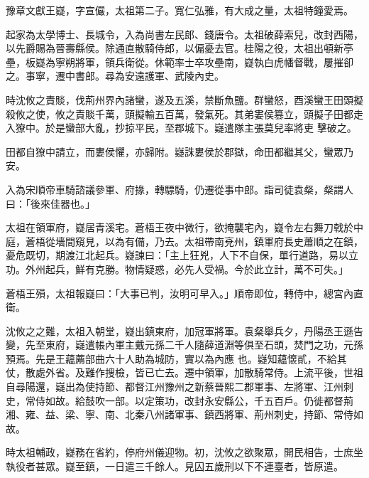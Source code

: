 
\begin{pinyinscope}

 豫章文獻王嶷，字宣儼，太祖第二子。寬仁弘雅，有大成之量，太祖特鐘愛焉。



 起家為太學博士、長城令，入為尚書左民郎、錢唐令。太祖破薛索兒，改封西陽，以先爵賜為晉壽縣侯。除通直散騎侍郎，以偏憂去官。桂陽之役，太祖出頓新亭壘，板嶷為寧朔將軍，領兵衛從。休範率士卒攻壘南，嶷執白虎幡督戰，屢摧卻之。事寧，遷中書郎。尋為安遠護軍、武陵內史。



 時沈攸之責賧，伐荊州界內諸蠻，遂及五溪，禁斷魚鹽。群蠻怒，酉溪蠻王田頭擬殺攸之使，攸之責賧千萬，頭擬輸五百萬，發氣死。其弟婁侯篡立，頭擬子田都走入獠中。於是蠻部大亂，抄掠平民，至郡城下。嶷遣隊主張莫兒率將吏
 擊破之。



 田都自獠中請立，而婁侯懼，亦歸附。嶷誅婁侯於郡獄，命田都繼其父，蠻眾乃安。



 入為宋順帝車騎諮議參軍、府掾，轉驃騎，仍遷從事中郎。詣司徒袁粲，粲謂人曰：「後來佳器也。」



 太祖在領軍府，嶷居青溪宅。蒼梧王夜中微行，欲掩襲宅內，嶷令左右舞刀戟於中庭，蒼梧從墻間窺見，以為有備，乃去。太祖帶南兗州，鎮軍府長史蕭順之在鎮，憂危既切，期渡江北起兵。嶷諫曰：「主上狂兇，人下不自保，單行道路，易以立功。外州起兵，鮮有克勝。物情疑惑，必先人受禍。今於此立計，萬不可失。」



 蒼梧王殞，太祖報嶷曰：「大事已判，汝明可早入。」順帝即位，轉侍中，總宮內直衛。



 沈攸之之難，太祖入朝堂，嶷出鎮東府，加冠軍將軍。袁粲舉兵夕，丹陽丞王遜告變，先至東府，嶷遣帳內軍主戴元孫二千人隨薛道淵等俱至石頭，焚門之功，元孫預焉。先是王蘊薦部曲六十人助為城防，實以為內應
 也。嶷知蘊懷貳，不給其仗，散處外省。及難作搜檢，皆已亡去。遷中領軍，加散騎常侍。上流平後，世祖自尋陽還，嶷出為使持節、都督江州豫州之新蔡晉熙二郡軍事、左將軍、江州刺史，常侍如故。給鼓吹一部。以定策功，改封永安縣公，千五百戶。仍徙都督荊湘、雍、益、梁、寧、南、北秦八州諸軍事、鎮西將軍、荊州刺史，持節、常侍如故。



 時太祖輔政，嶷務在省約，停府州儀迎物。初，沈攸之欲聚眾，開民相告，士庶坐執役者甚眾。嶷至鎮，一日遣三千餘人。見囚五歲刑以下不連臺者，皆原遣。




\end{pinyinscope}
